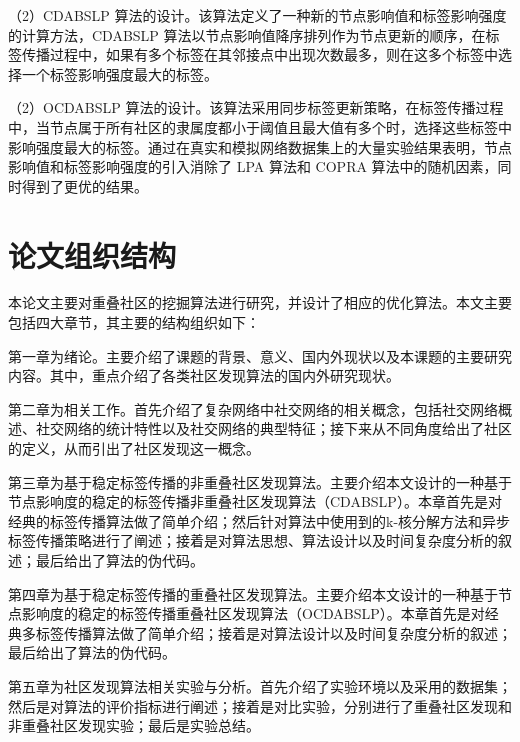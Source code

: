 （2）CDABSLP 算法的设计。该算法定义了一种新的节点影响值和标签影响强度的计算方法，CDABSLP 算法以节点影响值降序排列作为节点更新的顺序，在标签传播过程中，如果有多个标签在其邻接点中出现次数最多，则在这多个标签中选择一个标签影响强度最大的标签。

（2）OCDABSLP 算法的设计。该算法采用同步标签更新策略，在标签传播过程中，当节点属于所有社区的隶属度都小于阈值且最大值有多个时，选择这些标签中影响强度最大的标签。通过在真实和模拟网络数据集上的大量实验结果表明，节点影响值和标签影响强度的引入消除了 LPA 算法和 COPRA 算法中的随机因素，同时得到了更优的结果。 


\section{论文组织结构}

本论文主要对重叠社区的挖掘算法进行研究，并设计了相应的优化算法。本文主要包括四大章节，其主要的结构组织如下：

第一章为绪论。主要介绍了课题的背景、意义、国内外现状以及本课题的主要研究内容。其中，重点介绍了各类社区发现算法的国内外研究现状。

第二章为相关工作。首先介绍了复杂网络中社交网络的相关概念，包括社交网络概述、社交网络的统计特性以及社交网络的典型特征；接下来从不同角度给出了社区的定义，从而引出了社区发现这一概念。

第三章为基于稳定标签传播的非重叠社区发现算法。主要介绍本文设计的一种基于节点影响度的稳定的标签传播非重叠社区发现算法（CDABSLP）。本章首先是对经典的标签传播算法做了简单介绍；然后针对算法中使用到的k-核分解方法和异步标签传播策略进行了阐述；接着是对算法思想、算法设计以及时间复杂度分析的叙述；最后给出了算法的伪代码。

第四章为基于稳定标签传播的重叠社区发现算法。主要介绍本文设计的一种基于节点影响度的稳定的标签传播重叠社区发现算法（OCDABSLP）。本章首先是对经典多标签传播算法做了简单介绍；接着是对算法设计以及时间复杂度分析的叙述；最后给出了算法的伪代码。

第五章为社区发现算法相关实验与分析。首先介绍了实验环境以及采用的数据集；然后是对算法的评价指标进行阐述；接着是对比实验，分别进行了重叠社区发现和非重叠社区发现实验；最后是实验总结。
